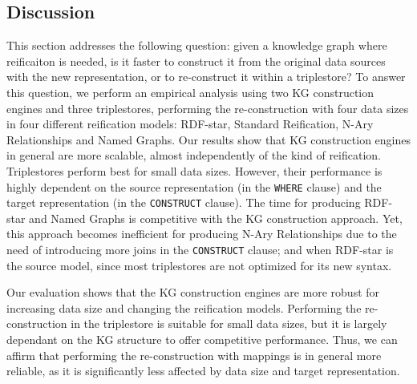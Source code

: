 



\subsection{Discussion}
\label{sec:chp6-1_discussion}

This section addresses the following question: given a knowledge graph where reificaiton is needed, is it faster to construct it from the original data sources with the new representation, or to re-construct it within a triplestore? To answer this question, we perform an empirical analysis using two KG construction engines and three triplestores, performing the re-construction with four data sizes in four different reification models: RDF-star, Standard Reification, N-Ary Relationships and Named Graphs. Our results show that KG construction engines in general are more scalable, almost independently of the kind of reification. Triplestores perform best for small data sizes. However, their performance is highly dependent on the source representation (in the \texttt{WHERE} clause) and the target representation (in the \texttt{CONSTRUCT} clause). The time for producing RDF-star and Named Graphs is competitive with the KG construction approach. Yet, this approach becomes inefficient for producing N-Ary Relationships due to the need of introducing more joins in the \texttt{CONSTRUCT} clause; and when RDF-star is the source model, since most triplestores are not optimized for its new syntax. 

Our evaluation shows that the KG construction engines are more robust for increasing data size and changing the reification models. Performing the re-construction in the triplestore is suitable for small data sizes, but it is largely dependant on the KG structure to offer competitive performance. Thus, we can affirm that performing the re-construction with mappings is in general more reliable, as it is significantly less affected by data size and target representation. 


